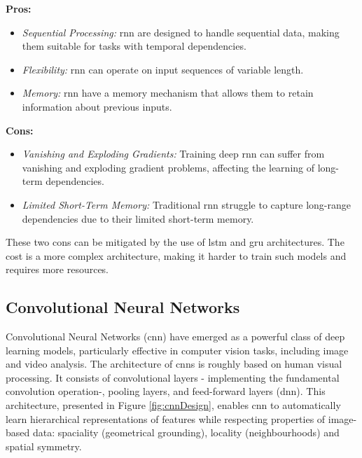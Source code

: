 \textbf{Pros:}
\begin{itemize}
    \item \textit{Sequential Processing:} \gls{rnn} are designed to handle sequential data, making them suitable for tasks with temporal dependencies.
    \item \textit{Flexibility:} \gls{rnn} can operate on input sequences of variable length.
    \item \textit{Memory:} \gls{rnn} have a memory mechanism that allows them to retain information about previous inputs.
\end{itemize}

\textbf{Cons:}
\begin{itemize}
    \item \textit{Vanishing and Exploding Gradients:} Training deep \gls{rnn} can suffer from vanishing and exploding gradient problems, affecting the learning of long-term dependencies.
    \item \textit{Limited Short-Term Memory:} Traditional \gls{rnn} struggle to capture long-range dependencies due to their limited short-term memory. 
\end{itemize}

These two cons can be mitigated by the use of \gls{lstm} and \gls{gru} architectures. The cost is a more complex architecture, making it harder to train such models and requires more resources. 

\subsection{Convolutional Neural Networks}
Convolutional Neural Networks (\gls{cnn}) \cite{NIPS198953c3bce6, NIPS2012_c399862d} have emerged as a powerful class of deep learning models, particularly effective in computer vision tasks, including image and video analysis. The architecture of \gls{cnn}s is roughly based on human visual processing. It consists of convolutional layers - implementing the fundamental convolution operation-, pooling layers, and feed-forward layers (\gls{dnn}). This architecture, presented in Figure \ref{fig:cnnDesign}, enables \gls{cnn} to automatically learn hierarchical representations of features while respecting properties of image-based data: spaciality (geometrical grounding), locality (neighbourhoods) and spatial symmetry.

